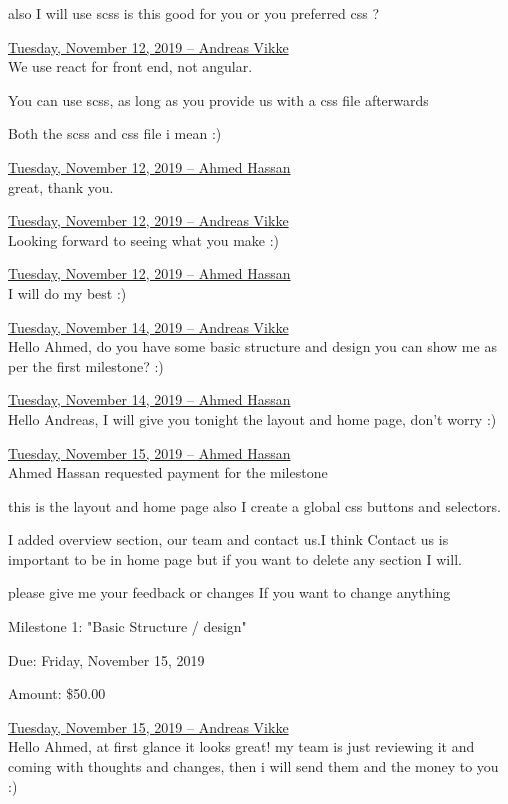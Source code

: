 \documentclass[11pt]{report}
\begin{document}
\noindent also I will use scss is this good for you or you preferred css ?

\noindent\underline{Tuesday, November 12, 2019 – Andreas Vikke}\\
\noindent We use react for front end, not angular.

\noindent You can use scss, as long as you provide us with a css file afterwards

\noindent Both the scss and css file i mean :)

\noindent\underline{Tuesday, November 12, 2019 – Ahmed Hassan}\\
\noindent great, thank you.

\noindent\underline{Tuesday, November 12, 2019 – Andreas Vikke}\\
\noindent Looking forward to seeing what you make :)

\noindent\underline{Tuesday, November 12, 2019 – Ahmed Hassan}\\
\noindent I will do my best :)

\noindent\underline{Tuesday, November 14, 2019 – Andreas Vikke}\\
\noindent Hello Ahmed, do you have some basic structure and design you can show me as per the first milestone? :)

\noindent\underline{Tuesday, November 14, 2019 – Ahmed Hassan}\\
\noindent Hello Andreas, I will give you tonight the layout and home page, don’t worry :)


\noindent\underline{Tuesday, November 15, 2019 – Ahmed Hassan}\\
\noindent Ahmed Hassan requested payment for the milestone

\noindent this is the layout and home page also I create a global css buttons and selectors.

\noindent I added overview section, our team and contact us.I think Contact us is important to be in home page but if you want to delete any section I will.

\noindent please give me your feedback or changes If you want to change anything

Milestone 1: "Basic Structure / design"

Due: Friday, November 15, 2019

Amount: \$50.00

\noindent\underline{Tuesday, November 15, 2019 – Andreas Vikke}\\
\noindent Hello Ahmed, at first glance it looks great! my team is just reviewing it and coming with thoughts and changes, then i will send them and the money to you :)
\end{document}
